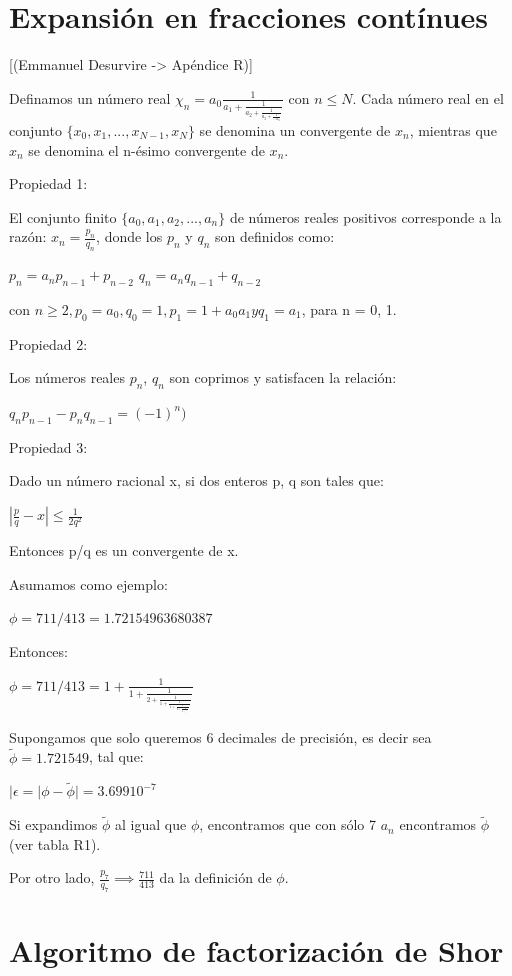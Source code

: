 \section{Expansión en fracciones contínues}

[(Emmanuel Desurvire -> Apéndice R)]

Definamos un número real $\chi_n = a_0 \frac{1}{a_1 + \frac{1}{a_2 + \frac{1}{a_3 + \frac{1}{... a_n}}}}$ con $n \leq N$. Cada número real en el conjunto $\{x_0,x_1,...,x_{N-1},x_N\}$ se denomina un convergente de $x_n$, mientras que $x_n$ se denomina el n-ésimo convergente de $x_n$.

Propiedad 1:

El conjunto finito $\{a_0,a_1,a_2,...,a_n\}$ de números reales positivos corresponde a la razón: $x_n = \frac{p_n}{q_n}$, donde los $p_n$ y $q_n$ son definidos como:

$p_n = a_n p_{n-1} + p_{n-2}$
$q_n = a_n q_{n-1} + q_{n-2}$

con $n \geq 2, p_0 = a_0, q_0 = 1, p_1 = 1 + a_0 a_1 y q_1 = a_1$, para n = 0, 1.

Propiedad 2:

Los números reales $p_n$, $q_n$ son coprimos y satisfacen la relación:

$q_n p_{n-1} - p_n q_{n-1} = (-1)^n)$

Propiedad 3:

Dado un número racional x, si dos enteros p, q son tales que:

$|\frac{p}{q} - x| \leq \frac{1}{2q^2}$

Entonces p/q es un convergente de x.

Asumamos como ejemplo:

$\phi = 711/413 = 1.72154963680387$

Entonces:

$\phi = 711/413 = 1 + \frac{1}{1 + \frac{1}{2 + \frac{1}{1 + \frac{1}{1 + \frac{1}{2 + \frac{1}{4 + \frac{1}{5}}}}}}}$

Supongamos que solo queremos 6 decimales de precisión, es decir sea $\tilde{\phi} = 1.721549$, tal que:

$|\epsilon = |\phi - \tilde{\phi}| = 3.699 10^{-7}$

Si expandimos $\tilde{\phi}$ al igual que $\phi$, encontramos que con sólo 7 $a_n$ encontramos $\tilde{\phi}$ (ver tabla R1).

Por otro lado, $\frac{p_7}{q_7} \implies \frac{711}{413}$ da la definición de $\phi$.

\section{Algoritmo de factorización de Shor}

